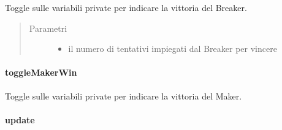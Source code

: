 \documentclass[letterpaper,10pt,italian,openany,oneside]{sphinxmanual}
\begin{document}
\begin{fulllineitems}
\label{\detokenize{source/it/unicam/cs/pa/mastermind/gamecore/MatchState:it.unicam.cs.pa.mastermind.gamecore.MatchState.toggleBreakerWin(int)}}
Toggle sulle variabili private per indicare la vittoria del Breaker.
\begin{quote}\begin{description}
\item[{Parametri}] \leavevmode\begin{itemize}
\item {} 
 \textendash{} il numero di tentativi impiegati dal Breaker per vincere

\end{itemize}

\end{description}\end{quote}

\end{fulllineitems}



\paragraph{toggleMakerWin}
\label{\detokenize{source/it/unicam/cs/pa/mastermind/gamecore/MatchState:togglemakerwin}}

\begin{fulllineitems}
\label{\detokenize{source/it/unicam/cs/pa/mastermind/gamecore/MatchState:it.unicam.cs.pa.mastermind.gamecore.MatchState.toggleMakerWin()}}
Toggle sulle variabili private per indicare la vittoria del Maker.

\end{fulllineitems}



\paragraph{update}
\label{\detokenize{source/it/unicam/cs/pa/mastermind/gamecore/MatchState:update}}
\end{document}

